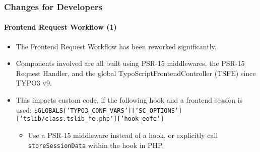 
\begin{frame}[fragile]
	\frametitle{Changes for Developers}
	\framesubtitle{Frontend Request Workflow (1)}

	\lstset{basicstyle=\smaller\ttfamily}

	\begin{itemize}
		\item The Frontend Request Workflow has been reworked significantly.

		\item Components involved are all built using PSR-15 middlewares, the PSR-15 Request Handler,
			and the global TypoScriptFrontendController (TSFE) since TYPO3 v9.

		\item This impacts custom code, if the following hook and a frontend session is used:\newline
			{\fontsize{7}{8}\selectfont\texttt{\$GLOBALS['TYPO3\_CONF\_VARS']['SC\_OPTIONS']['tslib/class.tslib\_fe.php']['hook\_eofe']}}

			\begin{itemize}\smaller
				\item[\ding{228}] Use a PSR-15 middleware instead of a hook, or explicitly call \texttt{storeSessionData}
				within the hook in PHP.
			\end{itemize}\normalsize

	\end{itemize}

\end{frame}


